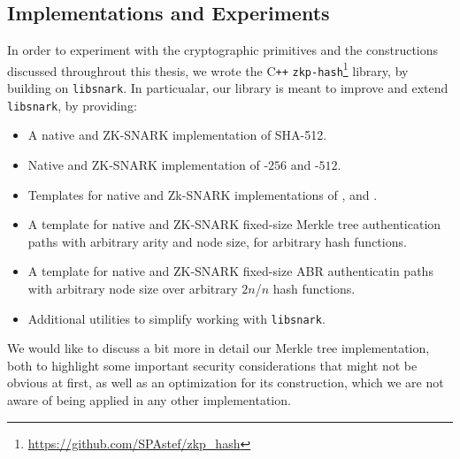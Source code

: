 \subsection{Implementations and Experiments}
In order to experiment with the cryptographic primitives and the constructions discussed 
throughrout this thesis, we wrote the C\texttt{++} 
\texttt{zkp-hash}\footnote{\url{https://github.com/SPAstef/zkp_hash}} library, by building on
\texttt{libsnark}.
In particualar, our library is meant to improve and extend \texttt{libsnark}, by providing: 
\begin{itemize}
  \item A native and ZK-SNARK implementation of SHA-512.
  \item Native and ZK-SNARK implementation of \Mimchash-\(256\) and \Mimchash-\(512\).
  \item Templates for native and Zk-SNARK implementations of \Poseidon, \Griffin{} 
        and \Arionhash.
  \item A template for native and ZK-SNARK fixed-size Merkle tree authentication paths with 
        arbitrary arity and node size, for arbitrary hash functions.
  \item A template for native and ZK-SNARK fixed-size ABR authenticatin paths with arbitrary node 
        size over arbitrary \(2n\)/\(n\) hash functions.
  \item Additional utilities to simplify working with \texttt{libsnark}.
\end{itemize}

We would like to discuss a bit more in detail our Merkle tree implementation, both to highlight some 
important security considerations that might not be obvious at first, as well as an optimization 
for its construction, which we are not aware of being applied in any other implementation.

